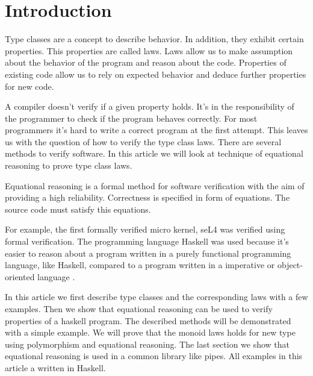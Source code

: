 \section{Introduction}
\label{sec:intro}

Type classes are a concept to describe behavior. In addition, they exhibit certain properties. This properties are called laws. 
Laws allow us to make assumption about the behavior of the program and reason about the code. Properties of existing code allow us to rely on expected behavior and deduce further properties for new code.

A compiler doesn't verify if a given property holds. It's in the responsibility of the programmer to check if the program behaves correctly. For most programmers it's hard to write a correct program at the first attempt. This leaves us with the question of how to verify the type class laws. There are several methods to verify software. In this article we will look at technique of equational reasoning to prove type class laws. 

Equational reasoning is a formal method for software verification with the aim of providing a high reliability. 
Correctness is specified in form of equations. The source code must satisfy this equations. 

For example, the first formally verified micro kernel, seL4 was verified using formal verification. The programming language Haskell was used because it's easier to reason about a program written in a purely functional programming language, like Haskell, compared to a program written in a imperative or object-oriented language  \cite{Klein09}. 

In this article we first describe type classes and the corresponding laws with a few examples. Then we show that equational reasoning can be used to verify properties of a haskell program. The described methods will be demonstrated with a simple example. We will prove that the monoid laws holds for new type using polymorphism and equational reasoning. The last section we show that equational reasoning is used in a common library like pipes. All examples in this article a written in Haskell.

